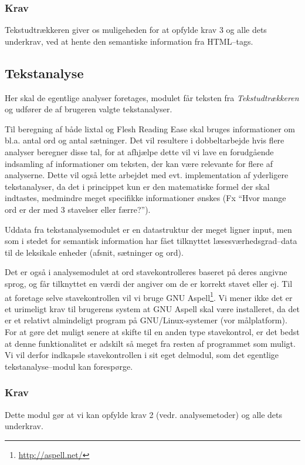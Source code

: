 \documentclass[a4paper,oneside]{memoir}
\begin{document}
\subsubsection{Krav}
Tekstudtrækkeren giver os muligeheden for at opfylde krav 3 og alle
dets underkrav, ved at hente den semantiske information fra
HTML--tags.

\subsection{Tekstanalyse}
\label{tekstanalysedesign}
Her skal de egentlige analyser foretages, modulet får teksten fra
\textit{Tekstudtrækkeren} og udfører de af brugeren valgte
tekstanalyser.

Til beregning af både lixtal og Flesh Reading Ease skal bruges
informationer om bl.a. antal ord og antal sætninger. Det vil resultere
i dobbeltarbejde hvis flere analyser beregner disse tal, for at
afhjælpe dette vil vi lave en forudgående indsamling af informationer
om teksten, der kan være relevante for flere af analyserne. Dette vil
også lette arbejdet med evt. implementation af yderligere
tekstanalyser, da det i princippet kun er den matematiske formel der
skal indtastes, medmindre meget specifikke informationer ønskes
(Fx ``Hvor mange ord er der med 3 stavelser eller færre?'').

Uddata fra tekstanalysemodulet er en datastruktur der meget ligner
input, men som i stedet for semantisk information har fået tilknyttet
læsesværhedsgrad--data til de leksikale enheder (afsnit, sætninger og
ord).

Det er også i analysemodulet at ord stavekontrolleres baseret på deres
angivne sprog, og får tilknyttet en værdi der angiver om de er korrekt
stavet eller ej. Til at foretage selve stavekontrollen vil vi bruge
GNU Aspell\footnote{\url{http://aspell.net/}}. Vi mener ikke det er et
urimeligt krav til brugerens system at GNU Aspell skal være
installeret, da det er et relativt almindeligt program på
GNU/Linux-systemer (vor målplatform). For at gøre det muligt senere at
skifte til en anden type stavekontrol, er det bedst at denne
funktionalitet er adskilt så meget fra resten af programmet som
muligt. Vi vil derfor indkapsle stavekontrollen i sit eget delmodul,
som det egentlige tekstanalyse--modul kan forespørge.

\subsubsection{Krav}
Dette modul gør at vi kan opfylde krav 2 (vedr. analysemetoder) og
alle dets underkrav.
\end{document}
